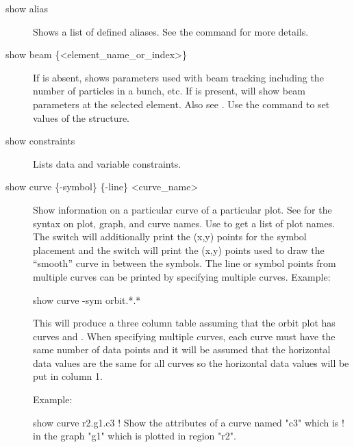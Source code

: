 {{\begin{description}

\item[show alias] \Newline
Shows a list of defined aliases. See the  command for more
details.


\item[show beam \{<element\_name\_or\_index>\}] \Newline

If  is absent,  shows
parameters used with beam tracking including the number of particles
in a bunch, etc.  If  is present,  will show beam parameters at the selected element. Also see
.  Use the  command to set values
of the  structure.


\item[show constraints] \Newline
Lists data and variable constraints.


\item[show curve \{-symbol\} \{-line\} <curve\_name>] \Newline
Show information on a particular curve of a particular plot. See
 for the syntax on plot, graph, and curve names.  Use
 to get a list of plot names. The  switch
will additionally print the (x,y) points for the symbol placement and
the  switch will print the (x,y) points used to draw the
``smooth'' curve in between the symbols. The line or symbol points
from multiple curves can be printed by specifying multiple curves. Example:
\begin{example}
  show curve -sym orbit.*.*
\end{example}
This will produce a three column table assuming that the orbit plot
has curves  and . When specifying
multiple curves, each curve must have the same number of data points
and it will be assumed that the horizontal data values are the same
for all curves so the horizontal data values will be put in column 1.

Example:
\begin{example}
  show curve r2.g1.c3     ! Show the attributes of a curve named "c3" which is 
                          !   in the graph "g1" which is plotted in region "r2".
\end{example}


\end{description}}}
